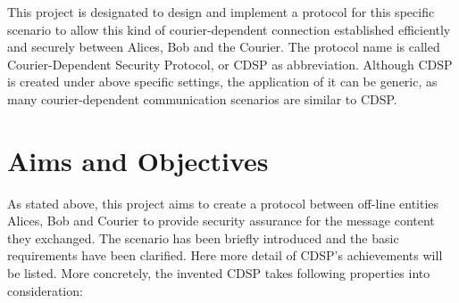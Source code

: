 This project is designated to design and implement a protocol for this specific scenario to allow this kind of courier-dependent connection established efficiently and securely between Alices, Bob and the Courier. The protocol name is called Courier-Dependent Security Protocol, or CDSP as abbreviation. Although CDSP is created under above specific settings, the application of it can be generic, as many courier-dependent communication scenarios are similar to CDSP.

\section{Aims and Objectives}
As stated above, this project aims to create a protocol between off-line entities Alices, Bob and Courier to provide security assurance for the message content they exchanged. The scenario has been briefly introduced and the basic requirements have been clarified. Here more detail of CDSP's achievements will be listed. More concretely, the invented CDSP takes following properties into consideration:

